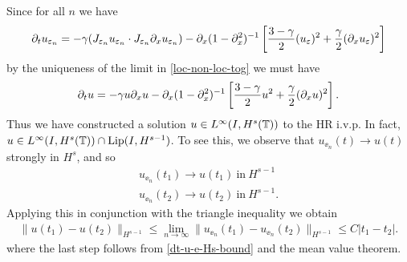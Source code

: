 %
Since for all $n$ we have 
%
\begin{equation}
\partial_tu_{\varepsilon_n} 
=
-\gamma (J_{\varepsilon_n} u_{\varepsilon_n}  \cdot
J_{\varepsilon_n}\partial_x u_{\varepsilon_n}) - \partial_x (1-
\partial_x^2)^{-1} \left
[\frac{3-\gamma}{2}(u_\varepsilon)^2 + \frac{\gamma}{2}(\partial_x u_\varepsilon)^2 \right ] 
\end{equation}
%
by the uniqueness  of the limit in \eqref{loc-non-loc-tog}
we must have
%
\begin{equation}
\label{1000y}
\partial_t u =- \gamma u \partial_x u- \partial_x (1- \partial_x^2)^{-1} \left
[\frac{3-\gamma}{2}u^2 + \frac{\gamma}{2}(\partial_x u)^2 \right ].
\end{equation}
%
Thus we have constructed a solution $u \in L^\infty(I, H^s(\mathbb{T}))$
to the HR i.v.p. In fact, $u \in L^{\infty}(I, H^{s}(\mathbb{T})) \cap \text{Lip}(I,
H^{s-1})$. To see this, we observe that $u_{\ee_{n}}(t) \to u(t)$ strongly in $H^{s}$, and so
%
%
\begin{gather*}
    u_{\ee_{n}}(t_{1}) \to u(t_{1})    \ \text{in} \ H^{s-1}
    \\
    u_{\ee_{n}}(t_{2})  \to u(t_{2})  \ \text{in} \ H^{s-1}.
\end{gather*}
%
%
Applying this in conjunction with the triangle inequality  we obtain
%
%
\begin{equation*}
\begin{split}
    \| u(t_{1}) - u(t_{2}) \|_{H^{s-1}} \le \lim_{n \to \infty} \| u_{\ee_{n}}(t_{1}) - u_{\ee_{n}}(t_{2}) \|_{H^{s-1}} \le C | t_{1} - t_{2} |.
\end{split}
\end{equation*}
%
%
where the last step follows from \eqref{dt-u-e-Hs-bound} and the mean value theorem.
%
%
%
%
%
%
%
